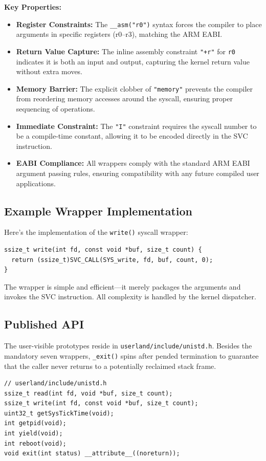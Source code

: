 \documentclass[11pt,a4paper]{article}
\newcommand{\file}[1]{\texttt{#1}}
\newcommand{\reg}[1]{\texttt{#1}}
\begin{document}
\textbf{Key Properties:}
\begin{itemize}[leftmargin=1.5em]
  \item \textbf{Register Constraints:} The \texttt{\_\_asm("r0")} syntax forces the compiler to place arguments in specific registers (r0--r3), matching the ARM EABI.
  \item \textbf{Return Value Capture:} The inline assembly constraint \texttt{"+r"} for \reg{r0} indicates it is both an input and output, capturing the kernel return value without extra moves.
  \item \textbf{Memory Barrier:} The explicit clobber of \texttt{"memory"} prevents the compiler from reordering memory accesses around the syscall, ensuring proper sequencing of operations.
  \item \textbf{Immediate Constraint:} The \texttt{"I"} constraint requires the syscall number to be a compile-time constant, allowing it to be encoded directly in the SVC instruction.
  \item \textbf{EABI Compliance:} All wrappers comply with the standard ARM EABI argument passing rules, ensuring compatibility with any future compiled user applications.
\end{itemize}

\subsection{Example Wrapper Implementation}
Here's the implementation of the \texttt{write()} syscall wrapper:

\begin{verbatim}
ssize_t write(int fd, const void *buf, size_t count) {
  return (ssize_t)SVC_CALL(SYS_write, fd, buf, count, 0);
}
\end{verbatim}

The wrapper is simple and efficient---it merely packages the arguments and invokes the SVC instruction. All complexity is handled by the kernel dispatcher.

\subsection{Published API}
The user-visible prototypes reside in \file{userland/include/unistd.h}. Besides the mandatory seven wrappers, \texttt{\_exit()} spins after pended termination to guarantee that the caller never returns to a potentially reclaimed stack frame.

\begin{verbatim}
// userland/include/unistd.h
ssize_t read(int fd, void *buf, size_t count);
ssize_t write(int fd, const void *buf, size_t count);
uint32_t getSysTickTime(void);
int getpid(void);
int yield(void);
int reboot(void);
void exit(int status) __attribute__((noreturn));
\end{verbatim}
\end{document}
